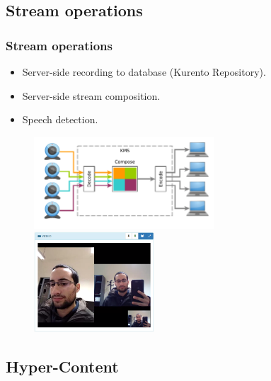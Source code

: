 \documentclass[compress]{beamer}
\begin{document}
\subsection{Stream operations}
	\begin{frame}[c]
		\frametitle{Stream operations}

		\begin{itemize}
			\item Server-side recording to database (Kurento Repository).
			\item Server-side stream composition.
			\item Speech detection.
		\end{itemize}
		\begin{figure}
			\vspace*{-1.5\baselineskip}

			\includegraphics[width=0.6\textwidth]{figures/wcomposite.pdf}
			\includegraphics[width=0.4\textwidth]{figures/devices.png}
		\end{figure}
		\end{frame}


\subsection{Hyper-Content}
\end{document}
